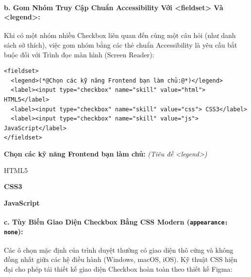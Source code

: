 \documentclass[11pt,oneside]{book}
\newcommand{\codeinline}[1]{\textcolor{accentOrange}{\texttt{#1}}}
\begin{document}
\paragraph{b. Gom Nhóm Truy Cập Chuẩn Accessibility Với <fieldset> Và <legend>:}
Khi có một nhóm nhiều Checkbox liên quan đến cùng một câu hỏi (như danh sách sở thích), việc gom nhóm bằng các thẻ chuẩn Accessibility là yêu cầu bắt buộc đối với Trình đọc màn hình (Screen Reader):

\begin{codeWindow}
\begin{lstlisting}[language=HTML5]
<fieldset>
  <legend>(*@Chọn các kỹ năng Frontend bạn làm chủ:@*)</legend>
  <label><input type="checkbox" name="skill" value="html"> HTML5</label>
  <label><input type="checkbox" name="skill" value="css"> CSS3</label>
  <label><input type="checkbox" name="skill" value="js"> JavaScript</label>
</fieldset>
\end{lstlisting}
\end{codeWindow}

\begin{browserWindow}
\sffamily\small
\textbf{Chọn các kỹ năng Frontend bạn làm chủ:} \textcolor{codeComment}{\small\textit{(Tiêu đề <legend>)}} \\[6pt]
 \; HTML5 \qquad
{} \; \textbf{CSS3} \qquad
{} \; \textbf{JavaScript}
\end{browserWindow}

\paragraph{c. Tùy Biến Giao Diện Checkbox Bằng CSS Modern (\codeinline{appearance: none}):}
Các ô chọn mặc định của trình duyệt thường có giao diện thô cứng và không đồng nhất giữa các hệ điều hành (Windows, macOS, iOS). Kỹ thuật CSS hiện đại cho phép tái thiết kế giao diện Checkbox hoàn toàn theo thiết kế Figma:
\end{document}
